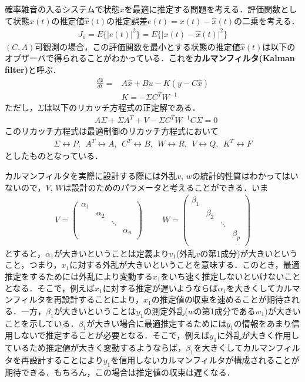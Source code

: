 確率雑音の入るシステムで状態$x$を最適に推定する問題を考える．評価関数として状態$x(t)$の推定値$\hat{x}(t)$の推定誤差$e(t) = x(t) - \hat{x}(t)$の二乗を考える．
\begin{align}
     J_o = E\{ \vert e(t) \vert^2 \} = E\{ \vert x(t) - \hat{x}(t) \vert^2 \}
\end{align}
$(C,A)$可観測の場合，この評価関数を最小とする状態の推定値$\hat{x}(t)$は以下のオブザーバで得られることがわかっている．これを{\bf カルマンフィルタ(Kalman filter)}と呼ぶ．
\begin{align}
 \frac{d \hat{x}}{dt} =& A \hat{x} + B u - K (y - C \hat{x})
\\
 & K = -\Sigma C^T W^{-1}
\end{align}
ただし，$\Sigma$は以下のリカッチ方程式の正定解である．
\begin{align}
 & A \Sigma + \Sigma A^T +  V - \Sigma C^T W^{-1} C \Sigma = 0
\label{riccati_kalman}
\end{align}
このリカッチ方程式は最適制御のリカッチ方程式において
\begin{align}
   \Sigma \leftrightarrow P,   \ \ 
   A^T    \leftrightarrow A, \ \ 
   C^T    \leftrightarrow B, \ \ 
   W      \leftrightarrow R, \ \ 
   V      \leftrightarrow Q, \ \ 
   K^T    \leftrightarrow F 
\end{align}
としたものとなっている．

カルマンフィルタを実際に設計する際には外乱$v$, $w$の統計的性質はわかってはいないので，$V$, $W$は設計のためのパラメータと考えることができる．いま
\begin{align}
	V =    \left(
			\begin{array}{cccc}
				\alpha_1 & & & \\
				& \alpha_2 & & \\
				& & \ddots & \\
				& & & \alpha_n \\
			\end{array}
		\right)
\hspace{1cm}
	W =    \left(
			\begin{array}{cccc}
				\beta_1 & & & \\
				& \beta_2 & & \\
				& & \ddots & \\
				& & & \beta_p \\
			\end{array}
		\right)
\end{align}
とすると，$\alpha_1$が大きいということは定義より$v_1$(外乱$v$の第1成分)が大きいということ，つまり，$x_1$に対する外乱が大きいということを意味する．このとき，最適推定をするためには外乱により変動する$x_1$をいち速く推定しないといけないこととなる．そこで，例えば$x_1$に対する推定が遅いようならば$\alpha_1$を大きくしてカルマンフィルタを再設計することにより，$x_1$の推定値の収束を速めることが期待される．一方，$\beta_1$が大きいということは$y_1$の測定外乱($w$の第1成分である$w_1$)が大きいことを示している．$\beta_1$が大きい場合に最適推定するためには$y_1$の情報をあまり信用しないで推定することが必要となる．そこで，例えば$y_1$に外乱が大きく作用しているため推定値が大きく変動するようならば，$\beta_1$を大きくしてカルマンフィルタを再設計することにより$y_1$を信用しないカルマンフィルタが構成されることが期待できる．もちろん，この場合は推定値の収束は遅くなる．

